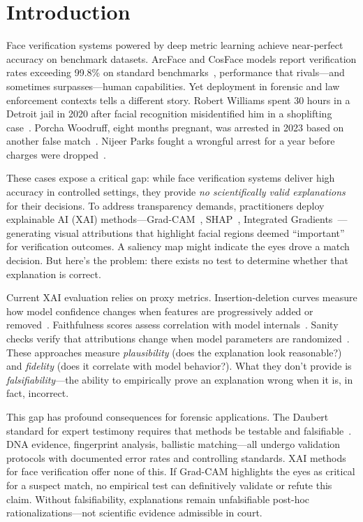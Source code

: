 \section{Introduction}
\label{sec:introduction}

Face verification systems powered by deep metric learning achieve near-perfect accuracy on benchmark datasets. ArcFace and CosFace models report verification rates exceeding 99.8\% on standard benchmarks~\citep{deng2019arcface,wang2018cosface}, performance that rivals—and sometimes surpasses—human capabilities. Yet deployment in forensic and law enforcement contexts tells a different story. Robert Williams spent 30 hours in a Detroit jail in 2020 after facial recognition misidentified him in a shoplifting case~\citep{hill2020wrongful}. Porcha Woodruff, eight months pregnant, was arrested in 2023 based on another false match~\citep{hill2023pregnant}. Nijeer Parks fought a wrongful arrest for a year before charges were dropped~\citep{parks2019wrongful}.

These cases expose a critical gap: while face verification systems deliver high accuracy in controlled settings, they provide \emph{no scientifically valid explanations} for their decisions. To address transparency demands, practitioners deploy explainable AI (XAI) methods—Grad-CAM~\citep{selvaraju2017gradcam}, SHAP~\citep{lundberg2017unified}, Integrated Gradients~\citep{sundararajan2017axiomatic}—generating visual attributions that highlight facial regions deemed ``important'' for verification outcomes. A saliency map might indicate the eyes drove a match decision. But here's the problem: there exists no test to determine whether that explanation is correct.

Current XAI evaluation relies on proxy metrics. Insertion-deletion curves measure how model confidence changes when features are progressively added or removed~\citep{petsiuk2018rise}. Faithfulness scores assess correlation with model internals~\citep{hooker2019benchmark}. Sanity checks verify that attributions change when model parameters are randomized~\citep{adebayo2018sanity}. These approaches measure \emph{plausibility} (does the explanation look reasonable?) and \emph{fidelity} (does it correlate with model behavior?). What they don't provide is \emph{falsifiability}—the ability to empirically prove an explanation wrong when it is, in fact, incorrect.

This gap has profound consequences for forensic applications. The Daubert standard for expert testimony requires that methods be testable and falsifiable~\citep{daubert1993}. DNA evidence, fingerprint analysis, ballistic matching—all undergo validation protocols with documented error rates and controlling standards. XAI methods for face verification offer none of this. If Grad-CAM highlights the eyes as critical for a suspect match, no empirical test can definitively validate or refute this claim. Without falsifiability, explanations remain unfalsifiable post-hoc rationalizations—not scientific evidence admissible in court.

